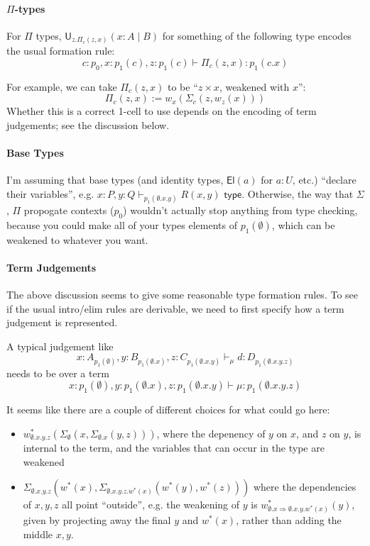 \documentclass[10pt]{article}
\newcommand{\yields}{\vdash}
\newcommand{\type}{\,\,\mathsf{type}}
\newcommand\U[3]{\ensuremath{\mathsf{U}_{#1}(#2 \mid #3)}}
\begin{document}
\paragraph{$\Pi$-types}

For $\Pi$ types, $\U{z.\Pi_c(z,x)}{x : A}{B}$ for something of the
following type encodes the usual formation rule:
\[ 
c : p_0, x : p_1(c), z : p_1(c) \yields \Pi_c(z,x) : p_1(c.x) 
\]

For example, we can take $\Pi_c(z,x)$ to be ``$z \times x$, weakened
with $x$'':
\[
\Pi_c(z,x) := w_x(\Sigma_c(z,w_z(x)))
\]
Whether this is a correct 1-cell to use depends on the encoding of term
judgements; see the discussion below.

\paragraph{Base Types}

I'm assuming that base types (and identity types, $\mathsf{El}(a)$ for
$a : U$, etc.) ``declare their variables'', e.g. $x : P, y : Q
\vdash_{p_1(\emptyset.x.y)} R(x,y) \type$.  Otherwise, the way that
$\Sigma$, $\Pi$ propogate contexts ($p_0$) wouldn't actually stop
anything from type checking, because you could make all of your types
elements of $p_1(\emptyset)$, which can be weakened to whatever you
want.

\paragraph{Term Judgements}  

The above discussion seems to give some reasonable type formation
rules.  To see if the usual intro/elim rules are derivable, we need to
first specify how a term judgement is represented. 

A typical judgement like 
\[
x : A_{p_1(\emptyset)}, y : B_{p_1(\emptyset.x)}, z : C_{p_1(\emptyset.x.y)} \vdash_{\mu} d : D_{p_1(\emptyset.x.y.z)}
\]
needs to be over a term 
\[
x : p_1(\emptyset), y : p_1(\emptyset.x), z : p_1(\emptyset.x.y) \vdash \mu : p_1(\emptyset.x.y.z) 
\]

It seems like there are a couple of different choices for what could go
here:
\begin{itemize}

\item $w_{\emptyset.x.y.z}^*(\Sigma_{\emptyset}(x,\Sigma_{\emptyset.x}(y,z)))$,
where the depenency of $y$ on $x$, and $z$ on $y$, is internal to the
term, and the variables that can occur in the type are weakened  

\item $\Sigma_{\emptyset.x.y.z}(w^*(x), \Sigma_{\emptyset.x.y.z.w^*(x)}(w^*(y), w^*(z)))$
where the dependencies of $x,y,z$ all point ``outside'', e.g. 
the weakening of $y$ is $w_{\emptyset.x \Rightarrow \emptyset.x.y.w^*(x)}^*(y)$,
given by projecting away the final $y$ and $w^*(x)$, rather than adding
the middle $x,y$.  

\end{itemize}
\end{document}
